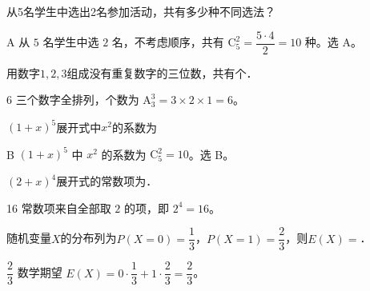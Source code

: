 


\begin{question}[GPT生成]
从5名学生中选出2名参加活动，共有多少种不同选法？\choiceBox
{}
\end{question}
\begin{answer}{A}
从 $5$ 名学生中选 $2$ 名，不考虑顺序，共有 $\mathrm{C}_5^2=\dfrac{5\cdot4}{2}=10$ 种。选 A。
\end{answer}

\begin{question}[GPT生成]
用数字$1,2,3$组成没有重复数字的三位数，共有\blank{3cm}个．
\end{question}
\begin{answer}{6}
三个数字全排列，个数为 $\mathrm{A}_3^3=3\times2\times1=6$。
\end{answer}



\begin{question}[GPT生成]
$(1+x)^5$展开式中$x^2$的系数为\choiceBox
{}
\end{question}
\begin{answer}{B}
$(1+x)^5$ 中 $x^2$ 的系数为 $\mathrm{C}_5^2=10$。选 B。
\end{answer}

\begin{question}[GPT生成]
$(2+x)^4$展开式的常数项为\blank{3cm}．
\end{question}
\begin{answer}{16}
常数项来自全部取 $2$ 的项，即 $2^4=16$。
\end{answer}



\begin{question}[GPT生成]
随机变量$X$的分布列为$P(X=0)=\dfrac13$，$P(X=1)=\dfrac23$，则$E(X)=$\blank{3cm}．
\end{question}
\begin{answer}{$\dfrac23$}
数学期望 $E(X)=0\cdot\dfrac13+1\cdot\dfrac23=\dfrac23$。
\end{answer}


